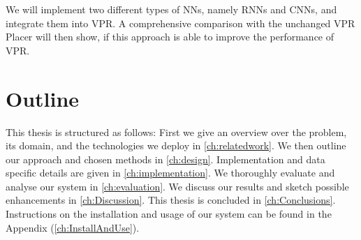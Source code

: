 We will implement two different types of \glspl{NN}, namely \glspl{RNN} and \glspl{CNN}, and integrate them into \gls{VPR}. A comprehensive comparison with the unchanged \gls{VPR} Placer will then show, if this approach is able to improve the performance of \gls{VPR}.

\section{Outline}

This thesis is structured as follows: First we give an overview over the problem, its domain, and the technologies we deploy in \ref{ch:relatedwork}. We then outline our approach and chosen methods in \ref{ch:design}. Implementation and data specific details are given in \ref{ch:implementation}. We thoroughly evaluate and analyse our system in \ref{ch:evaluation}. We discuss our results and sketch possible enhancements in \ref{ch:Discussion}. This thesis is concluded in \ref{ch:Conclusions}. Instructions on the installation and usage of our system can be found in the Appendix (\ref{ch:InstallAndUse}).